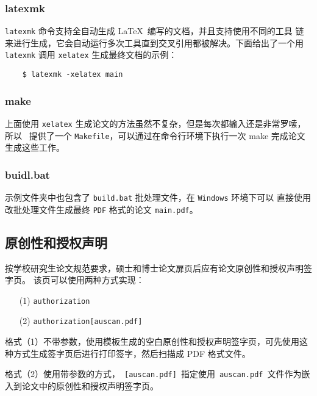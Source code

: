 \subsubsection{latexmk}
\label{sec:latexmk}

\texttt{latexmk} 命令支持全自动生成 \LaTeX\ 编写的文档，并且支持使用不同的工具
链来进行生成，它会自动运行多次工具直到交叉引用都被解决。下面给出了一个用
\texttt{latexmk} 调用 \texttt{xelatex} 生成最终文档的示例：

\begin{lstlisting}
    $ latexmk -xelatex main
\end{lstlisting}

\subsubsection{make}
\label{sec:make}

上面使用 \texttt{xelatex} 生成论文的方法虽然不复杂，但是每次都输入还是非常罗嗦，所以 \heuthesis\
提供了一个 \texttt{Makefile}，可以通过在命令行环境下执行一次 make 完成论文生成这些工作。

\subsubsection{buidl.bat}
\label{sec:build}

示例文件夹中也包含了 \texttt{build.bat} 批处理文件，在 \texttt{Windows} 环境下可以
直接使用改批处理文件生成最终 \texttt{PDF} 格式的论文 \texttt{main.pdf}。

\subsection{原创性和授权声明}
\label{sec:generate-auth}

按学校研究生论文规范要求，硕士和博士论文扉页后应有论文原创性和授权声明签字页。
该页可以使用两种方式实现：

\begin{enumerate}
  \item[(1)] \texttt{\cs authorization}
  \item[(2)] \texttt{\cs authorization[auscan.pdf]}
\end{enumerate}

格式（1）不带参数，使用模板生成的空白原创性和授权声明签字页，可先使用这种方式生成签字页后进行打印签字，然后扫描成 PDF 格式文件。

格式（2）使用带参数的方式，~\texttt{[auscan.pdf]}~指定使用~\texttt{auscan.pdf}~文件作为嵌入到论文中的原创性和授权声明签字页。

